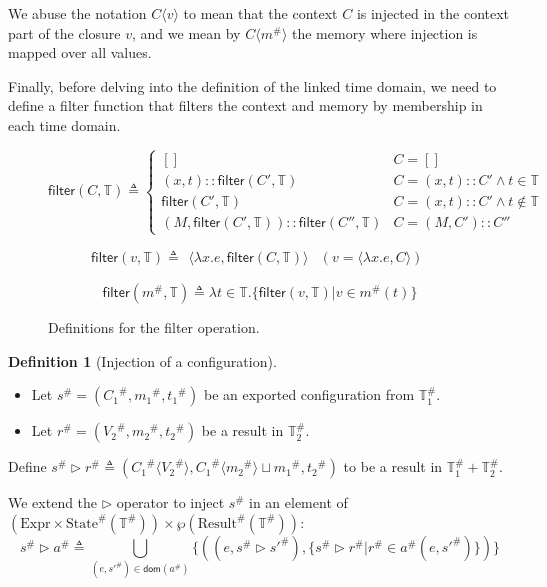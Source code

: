 \documentclass[acmsmall,screen,review]{acmart}
\theoremstyle{definition}
\newtheorem{definition}{Definition}[section]
\newcommand*{\cons}{::}
\newcommand*{\A}[1]{{#1}^{\#}}
\newcommand*{\Expr}{\text{Expr}}
\newcommand*{\Time}{\mathbb{T}}
\newcommand*{\ATime}{\A{\Time}}
\newcommand*{\mem}{m}
\newcommand*{\AConfig}[1]{\A{\text{State}}({#1})}
\newcommand*{\AResult}[1]{\A{\text{Result}}({#1})}
\newcommand*{\inject}[2]{{#1}\langle{#2}\rangle}
\newcommand*{\filter}{\mathsf{filter}}
\begin{document}
We abuse the notation $\inject{C}{v}$ to mean that the context $C$ is injected in the context part of the closure $v$, and we mean by $\inject{C}{\A\mem}$ the memory where injection is mapped over all values.

Finally, before delving into the definition of the linked time domain, we need to define a filter function that filters the context and memory by membership in each time domain.

\begin{figure}[h!]
  \footnotesize
  \[
    \filter(C,\Time)\triangleq
    \begin{cases}
      []                                           & C=[]                                \\
      (x,t)\cons\filter(C',\Time)                  & C=(x,t)\cons C'\wedge t\in\Time     \\
      \filter(C',\Time)                            & C=(x,t)\cons C'\wedge t\not\in\Time \\
      (M,\filter(C',\Time))\cons\filter(C'',\Time) & C=(M, C')\cons C''
    \end{cases}
  \]

  \[
    \filter(v,\Time)\triangleq
    \begin{array}{ll}
      \langle\lambda x.e,\filter(C,\Time)\rangle & (v=\langle\lambda x.e,C\rangle)
    \end{array}
  \]

  \[
    \filter(\A\mem,\Time)\triangleq
    \lambda t\in\Time.\{\filter(v,\Time)|v\in\A{m}(t)\}
  \]
  \caption{Definitions for the filter operation.}
\end{figure}

\begin{definition}[Injection of a configuration]
  $\:$

  \begin{itemize}
    \item Let $\A{s}=(\A{C_1},\A{\mem_1},\A{t_1})$ be an exported configuration from $\ATime_1$.
    \item Let $\A{r}=(\A{V_2},\A{\mem_2},\A{t_2})$ be a result in $\ATime_2$.
  \end{itemize}

  Define $\A{s}\rhd\A{r}\triangleq(\A{C_1}\langle\A{V_2}\rangle,\A{C_1}\langle\A{\mem_2}\rangle\sqcup\A{\mem_1},\A{t_2})$ to be a result in $\ATime_1+\ATime_2$.

  We extend the $\rhd$ operator to inject $\A{s}$ in an element of $(\Expr\times\AConfig{\ATime})\times{\wp(\AResult{\ATime})}$:
  \[
    \A{s}\rhd\A{a}\triangleq\bigcup_{(e,\A{s'})\in\mathsf{dom}(\A{a})}\{((e,\A{s}\rhd\A{s'}),\{\A{s}\rhd\A{r}|\A{r}\in\A{a}(e,\A{s'})\})\}
  \]
\end{definition}
\end{document}
